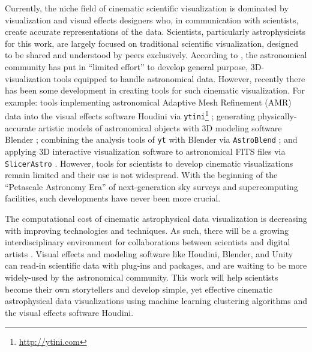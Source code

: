 \documentclass[fleqn,usenatbib,useAMS]{mnras}
\begin{document}
Currently, the niche field of cinematic scientific visualization is dominated by visualization and visual effects designers who, in communication with scientists, create accurate representations of the data. Scientists, particularly astrophysicists for this work, are largely focused on traditional scientific visualization, designed to be shared and understood by peers exclusively. According to \cite{Hassan11}, the astronomical community has put in ``limited effort'' to develop general purpose, 3D-visualization tools equipped to handle astronomical data. However, recently there has been some development in creating tools for such cinematic visualization. For example: tools implementing astronomical Adaptive Mesh Refinement (AMR) \citep{Berger84, Kahler02} data into the visual effects software Houdini via \texttt{ytini}\footnote{\url{http://ytini.com}} \citep{Naiman17, Borkiewicz19b}; generating physically-accurate artistic models of astronomical objects with 3D modeling software Blender \citep{Kent13, Kent15}; combining the analysis tools of \texttt{yt} \citep{Turk11} with  Blender via \texttt{AstroBlend} \citep{Naiman16}; and applying 3D interactive visualization software to astronomical FITS files via \texttt{SlicerAstro} \citep{Punzo17}. However, tools for scientists to develop cinematic visualizations remain limited and their use is not widespread. With the beginning of the ``Petascale Astronomy Era'' \citep{Hassan11} of next-generation sky surveys and supercomputing facilities, such developments have never been more crucial. \par

The computational cost of cinematic astrophysical data visualization is decreasing with improving technologies and techniques. As such, there will be a growing interdisciplinary environment for collaborations between scientists and digital artists \citep{Cox87}. Visual effects and modeling software like Houdini, Blender, and Unity can read-in scientific data with plug-ins and packages, and are waiting to be more widely-used by the astronomical community. This work will help scientists become their own storytellers and develop simple, yet effective cinematic astrophysical data visualizations using machine learning clustering algorithms and the visual effects software Houdini. \par 


\end{document}
